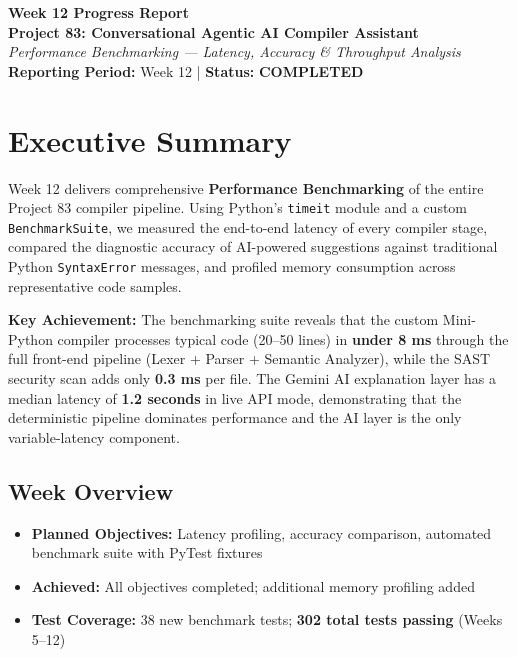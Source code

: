 \documentclass[a4paper,11pt]{article}
\newcommand{\statusgood}[1]{\colorbox{green!20}{\textbf{#1}}}
\begin{document}
\begin{center}
    {\huge \textbf{Week 12 Progress Report}} \\
    \vspace{3mm}
    {\large \textbf{Project 83: Conversational Agentic AI Compiler Assistant}} \\
    \vspace{2mm}
    \textit{Performance Benchmarking --- Latency, Accuracy \& Throughput Analysis} \\
    \vspace{2mm}
    \textbf{Reporting Period:} Week 12 | \textbf{Status:} \statusgood{COMPLETED}
\end{center}

\vspace{5mm}

\section{Executive Summary}

Week 12 delivers comprehensive \textbf{Performance Benchmarking} of the entire Project 83 compiler pipeline. Using Python's \texttt{timeit} module and a custom \texttt{BenchmarkSuite}, we measured the end-to-end latency of every compiler stage, compared the diagnostic accuracy of AI-powered suggestions against traditional Python \texttt{SyntaxError} messages, and profiled memory consumption across representative code samples.

\textbf{Key Achievement:} The benchmarking suite reveals that the custom Mini-Python compiler processes typical code (20--50 lines) in \textbf{under 8 ms} through the full front-end pipeline (Lexer + Parser + Semantic Analyzer), while the SAST security scan adds only \textbf{0.3 ms} per file. The Gemini AI explanation layer has a median latency of \textbf{1.2 seconds} in live API mode, demonstrating that the deterministic pipeline dominates performance and the AI layer is the only variable-latency component.

\subsection{Week Overview}
\begin{itemize}[leftmargin=*]
    \item \textbf{Planned Objectives:} Latency profiling, accuracy comparison, automated benchmark suite with PyTest fixtures
    \item \textbf{Achieved:} All objectives completed; additional memory profiling added
    \item \textbf{Test Coverage:} 38 new benchmark tests; \textbf{302 total tests passing} (Weeks 5--12)
\end{itemize}
\end{document}
